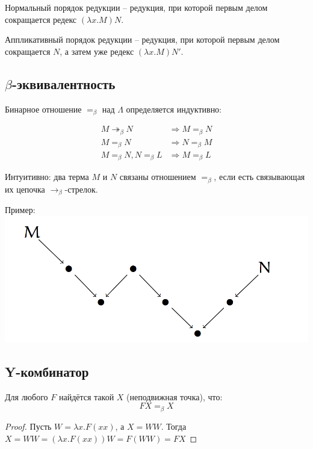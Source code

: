 Нормальный порядок редукции -- редукция, при которой первым делом сокращается
редекс $(\lambda x . M) N$.

Аппликативный порядок редукции -- редукция, при которой первым делом сокращается
$N$, а затем уже редекс $(\lambda x . M) N'$.

\subsection{$\beta$-эквивалентность}
\label{sec-3-6}

Бинарное отношение $=_\beta$ над $\Lambda$ определяется индуктивно:

\begin{align*}
M \twoheadrightarrow_\beta N &\Rightarrow M =_\beta N \\
M =_\beta N &\Rightarrow N =_\beta M \\
M =_\beta N, N =_\beta L &\Rightarrow M =_\beta L
\end{align*}

Интуитивно: два терма $M$ и $N$ связаны отношением $=_\beta$, если есть
связывающая их цепочка $\rightarrow_\beta$-стрелок.

Пример: \\
\includegraphics[scale=0.5]{resources/beta_equality.png}

\subsection{Y-комбинатор}
\label{sec-3-7}

\begin{theorem}
Для любого $F$ найдётся такой $X$ (неподвижная точка), что:
\begin{equation}
F X =_\beta X
\end{equation}
\end{theorem}
\begin{proof}
Пусть $W = \lambda x . F (x x)$, а $X = WW$. Тогда $X = WW = (\lambda x . F (x
x)) W = F (W W) = F X$
\end{proof}

